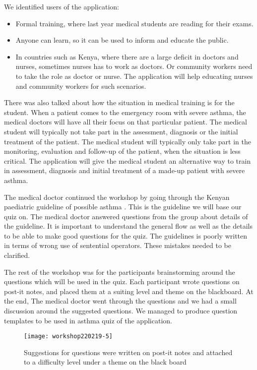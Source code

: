 We identified users of the application: 
\begin{itemize}
	\item Formal training, where last year medical students are reading for their exams.
	\item Anyone can learn, so it can be used to inform and educate the public.
	\item In countries such as Kenya, where there are a large deficit in doctors and nurses, sometimes nurses has to work as doctors. Or community workers need to take the role as doctor or nurse. The application will help educating nurses and community workers for such scenarios.
\end{itemize}
 
 There was also talked about how the situation in medical training is for the student. When a patient comes to the emergency room with severe asthma, the medical doctors will have all their focus on that particular patient. The medical student will typically not take part in the assessment, diagnosis or the initial treatment of the patient. The medical student will typically only take part in the monitoring, evaluation and follow-up of the patient, when the situation is less critical. The application will give the medical student an alternative way to train in assessment, diagnosis and initial treatment of a made-up patient with severe asthma. 

The medical doctor continued the workshop by going through the Kenyan paediatric guideline of possible asthma \parencite{RepublicofKeny2016}. This is the guideline we will base our quiz on. The medical doctor answered questions from the group about details of the guideline. It is important to understand the general flow as well as the details to be able to make good questions for the quiz. The guidelines is poorly written in terms of wrong use of sentential operators. These mistakes needed to be clarified.

The rest of the workshop was for the participants brainstorming around the questions which will be used in the quiz. Each participant wrote questions on post-it notes, and placed them at a suiting level and theme on the blackboard. At the end, The medical doctor went through the questions and we had a small discussion around the suggested questions. We managed to produce question templates to be used in asthma quiz of the application.

\begin{figure}[h!]
	\texttt{[image: workshop220219-5]}
	\caption {Suggestions for questions were written on post-it notes and attached to a difficulty level under a theme on the black board}
\end{figure}